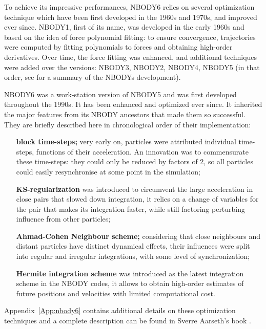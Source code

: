 To achieve its impressive performances, NBODY6 relies on several optimization technique which have been first developed in the 1960s and 1970s, and improved ever since. NBODY1, first of its name, was developed in the early 1960s and based on the idea of force polynomial fitting: to ensure convergence, trajectories were computed by fitting polynomials to forces and obtaining high-order derivatives. Over time, the force fitting was enhanced, and additional techniques were added over the versions: NBODY3, NBODY2, NBODY4, NBODY5 (in that order, see \citealt{Aarseth1999} for a summary of the NBODYs development).

NBODY6 was a work-station version of NBODY5 and was first developed throughout the 1990s. It has been enhanced and optimized ever since. It inherited the major features from its NBODY ancestors that made them so successful. They are briefly described here in chronological order of their implementation:

\begin{itemize}
\item[\textbf{block time-steps;}] very early on, particles were attributed individual time-steps, functions of their acceleration. An innovation was to commensurate these time-steps: they could only be reduced by factors of 2, so all particles could easily resynchronise at some point in the simulation;

\item[\textbf{KS-regularization}] was introduced to circumvent the large acceleration in close pairs that slowed down integration, it relies on a change of variables for the pair that makes its integration faster, while still factoring perturbing influence from other particles; 

\item[\textbf{Ahmad-Cohen Neighbour scheme;}] considering that close neighbours and distant particles have distinct dynamical effects, their influences were split into regular and irregular integrations, with some level of synchronization;

\item[\textbf{Hermite integration scheme}] was introduced as the latest integration scheme in the NBODY codes, it allows to obtain high-order estimates of future positions and velocities with limited computational cost.

\end{itemize}

Appendix~\ref{App:nbody6} contains additional details on these optimization techniques and a complete description can be found in Sverre Aarseth's book \citep{Aarseth2003}.

